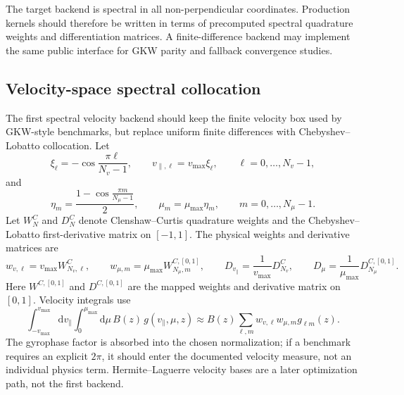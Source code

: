 \documentclass[11pt,a4paper]{article}
\newcommand{\dd}{\mathrm{d}}
\newcommand{\vpar}{v_{\parallel}}
\begin{document}
The target backend is spectral in all non-perpendicular coordinates.  Production kernels should therefore be written in terms of precomputed spectral quadrature weights and differentiation matrices.  A finite-difference backend may implement the same public interface for GKW parity and fallback convergence studies.

\subsection{Velocity-space spectral collocation}

The first spectral velocity backend should keep the finite velocity box used by GKW-style benchmarks, but replace uniform finite differences with Chebyshev--Lobatto collocation.  Let
\begin{equation}
  \xi_\ell = -\cos\frac{\pi\ell}{N_v-1},
  \qquad
  v_{\parallel,\ell}=v_{\max}\xi_\ell,
  \qquad
  \ell=0,\ldots,N_v-1,
  \label{eq:vpar-cheb-grid}
\end{equation}
and
\begin{equation}
  \eta_m=\frac{1-\cos\frac{\pi m}{N_\mu-1}}{2},
  \qquad
  \mu_m=\mu_{\max}\eta_m,
  \qquad
  m=0,\ldots,N_\mu-1.
  \label{eq:mu-cheb-grid}
\end{equation}
Let \(W^C_N\) and \(D^C_N\) denote Clenshaw--Curtis quadrature weights and the Chebyshev--Lobatto first-derivative matrix on \([-1,1]\).  The physical weights and derivative matrices are
\begin{equation}
  w_{v,\ell}=v_{\max} W^C_{N_v,\ell},
  \qquad
  w_{\mu,m}=\mu_{\max} W^{C,[0,1]}_{N_\mu,m},
  \qquad
  D_{v_\parallel}=\frac{1}{v_{\max}}D^C_{N_v},
  \qquad
  D_\mu=\frac{1}{\mu_{\max}}D^{C,[0,1]}_{N_\mu}.
  \label{eq:velocity-spectral-ops}
\end{equation}
Here \(W^{C,[0,1]}\) and \(D^{C,[0,1]}\) are the mapped weights and derivative matrix on \([0,1]\).  Velocity integrals use
\begin{equation}
  \int_{-v_{\max}}^{v_{\max}}\dd\vpar
  \int_0^{\mu_{\max}}\dd\mu\,
  B(z)\,g(\vpar,\mu,z)
  \approx
  B(z)
  \sum_{\ell,m} w_{v,\ell}w_{\mu,m}
  g_{\ell m}(z).
  \label{eq:velocity-spectral-quadrature}
\end{equation}
The gyrophase factor is absorbed into the chosen normalization; if a benchmark requires an explicit \(2\pi\), it should enter the documented velocity measure, not an individual physics term.  Hermite--Laguerre velocity bases are a later optimization path, not the first backend.
\end{document}
